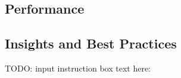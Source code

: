 \subsection{Performance}

\subsection{Insights and Best Practices}
 TODO: input instruction box text here:
